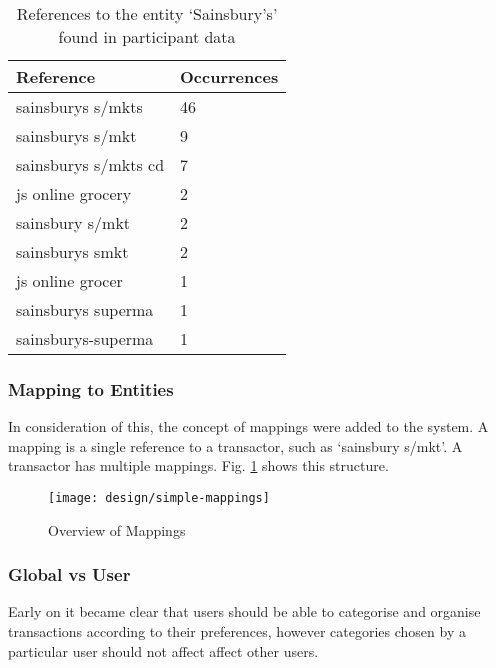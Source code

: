 \begin{table}[h]
\centering
\begin{tabular}{@{}ll@{}}
\toprule
Reference            & Occurrences \\ \midrule
sainsburys s/mkts    & 46          \\
sainsburys s/mkt     & 9           \\
sainsburys s/mkts cd & 7           \\
js online grocery    & 2           \\
sainsbury s/mkt      & 2           \\
sainsburys smkt      & 2           \\
js online grocer     & 1           \\
sainsburys superma   & 1           \\
sainsburys-superma   & 1           \\ \bottomrule
\end{tabular}
\caption{References to the entity `Sainsbury's' found in participant data}
\label{tab:sainsburys}
\end{table}

\subsubsection{Mapping to Entities}
In consideration of this, the concept of mappings were added to the system. A mapping is a single reference to a transactor, such as `sainsbury s/mkt'. A transactor has multiple mappings. Fig. \ref{fig:mapping} shows this structure.

\begin{figure}[h]
    \centering
    \texttt{[image: design/simple-mappings]}
    \caption{Overview of Mappings}
    \label{fig:mapping}
    
    \begin{comment}
[Transaction]<>*-[TransactorMapping]
[TransactorMapping]<>*-[Transactor]
    \end{comment}
\end{figure}


\subsubsection{Global vs User}
Early on it became clear that users should be able to categorise and organise transactions according to their preferences, however categories chosen by a particular user should not affect affect other users.


